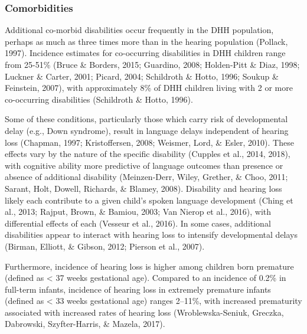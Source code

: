 \documentclass[english,man]{apa6}
\begin{document}
\hypertarget{comorbidities}{%
\subsubsection{Comorbidities}\label{comorbidities}}

Additional co-morbid disabilities occur frequently in the DHH population, perhaps as much as three times more than in the hearing population (Pollack, 1997). Incidence estimates for co-occurring disabilities in DHH children range from 25-51\% (Bruce \& Borders, 2015; Guardino, 2008; Holden-Pitt \& Diaz, 1998; Luckner \& Carter, 2001; Picard, 2004; Schildroth \& Hotto, 1996; Soukup \& Feinstein, 2007), with approximately 8\% of DHH children living with 2 or more co-occurring disabilities (Schildroth \& Hotto, 1996).

Some of these conditions, particularly those which carry risk of developmental delay (e.g., Down syndrome), result in language delays independent of hearing loss (Chapman, 1997; Kristoffersen, 2008; Weismer, Lord, \& Esler, 2010). These effects vary by the nature of the specific disability (Cupples et al., 2014, 2018), with cognitive ability more predictive of language outcomes than presence or absence of additional disability (Meinzen-Derr, Wiley, Grether, \& Choo, 2011; Sarant, Holt, Dowell, Richards, \& Blamey, 2008). Disability and hearing loss likely each contribute to a given child's spoken language development (Ching et al., 2013; Rajput, Brown, \& Bamiou, 2003; Van Nierop et al., 2016), with differential effects of each (Vesseur et al., 2016). In some cases, additional disabilities appear to interact with hearing loss to intensify developmental delays (Birman, Elliott, \& Gibson, 2012; Pierson et al., 2007).

Furthermore, incidence of hearing loss is higher among children born premature (defined as \textless{} 37 weeks gestational age). Compared to an incidence of 0.2\% in full-term infants, incidence of hearing loss in extremely premature infants (defined as \textless{} 33 weeks gestational age) ranges 2--11\%, with increased prematurity associated with increased rates of hearing loss (Wroblewska-Seniuk, Greczka, Dabrowski, Szyfter-Harris, \& Mazela, 2017).
\end{document}
